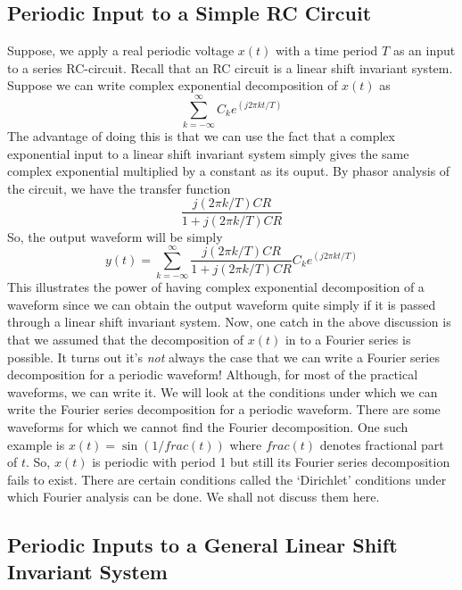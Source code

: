\subsection{Periodic Input to a Simple RC Circuit}
Suppose, we apply a real periodic voltage $x(t)$ with a time period $T$ as an input to a series RC-circuit. Recall that an RC circuit is a linear shift invariant system. Suppose we can write complex exponential decomposition of $x(t)$ as $$\sum_{k=-\infty}^{\infty}{C_{k}e^{(j2\pi kt/T)}}$$ The advantage of doing this is that we can use the fact that a complex exponential input to a linear shift invariant system simply gives the same complex exponential multiplied by a constant as its ouput. By phasor analysis of the circuit, we have the transfer function $$ \frac{j(2\pi k/T) CR}{1 + j(2\pi k/T) CR}$$
So, the output waveform will be simply
\begin{equation*}
	y(t) = \sum_{k=-\infty}^{\infty} \frac{j(2\pi k/T) CR}{1 + j(2\pi k/T) CR} {C_{k}e^{(j2\pi kt/T)}}	
\end{equation*}
This illustrates the power of having complex exponential decomposition of a waveform since we can obtain the output waveform quite simply if it is passed through a linear shift invariant system. Now, one catch in the above discussion is that we assumed that the decomposition of $x(t)$ in to a Fourier series is possible. It turns out it's \emph{not} always the case that we can write a Fourier series decomposition for a periodic waveform! Although, for most of the practical waveforms, we can write it. We will look at the conditions under which we can write the Fourier series decomposition for a periodic waveform. There are some waveforms for which we cannot find the Fourier decomposition. One such example is $x(t) = \sin{(1/frac(t))}$ where $frac(t)$ denotes fractional part of $t$. So, $x(t)$ is periodic with period 1 but still its Fourier series decomposition fails to exist. There are certain conditions called the ‘Dirichlet’ conditions under which Fourier analysis can be done. We shall not discuss them here.
\subsection{Periodic Inputs to a General Linear Shift Invariant System}


